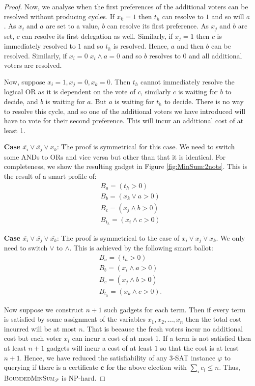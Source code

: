 \documentclass[11pt,a4paper, titlepage]{article}
\theoremstyle{definition}
\let\vec\mathbf
\begin{document}
\begin{proof}
    Now, we analyse when the first preferences of the additional voters can be resolved without producing cycles. 
    If $x_k = 1$ then $t_h$ can resolve to $1$ and so will $a$. 
    As $x_i$ and $a$ are set to a value, $b$ can resolve its first preference. 
    As $x_j$ and $b$ are set, $c$ can resolve its first delegation as well. 
    Similarly, if $x_j = 1$ then $c$ is immediately resolved to $1$ and so $t_h$ is resolved. 
    Hence, $a$ and then $b$ can be resolved. 
    Similarly, if $x_i = 0$ $x_i \land a = 0$ and so $b$ resolves to $0$ and all additional voters are resolved.
    
    Now, suppose $x_i = 1, x_j = 0, x_k = 0$. Then $t_h$ cannot immediately resolve the logical OR as it is dependent on the vote of $c$, similarly $c$ is waiting for $b$ to decide, and $b$ is waiting for $a$. 
    But $a$ is waiting for $t_h$ to decide. 
    There is no way to resolve this cycle, and so one of the additional voters we have introduced will have to vote for their second preference. 
    This will incur an additional cost of at least 1.

    \textbf{Case} $\overline{x_i} \lor \overline{x_j} \lor x_k$: 
    The proof is symmetrical for this case. We need to switch some ANDs to ORs and vice versa but other than that it is identical. 
    For completeness, we show the resulting gadget in Figure \ref{fig:MinSum:2nots}. 
    This is the result of a smart profile of:
    \begin{align*}
        &B_a = (t_h > 0) \\
        &B_b = (x_k \lor a > 0) \\
        &B_c = (x_j \land b > 0) \\
        &B_{t_h} = (x_i \land c > 0)
    \end{align*}


    \textbf{Case} $\overline{x_i} \lor \overline{x_j} \lor \overline{x_k}$:
    The proof is symmetrical to the case of $x_i \lor x_j \lor x_k$. We only need to switch $\lor$ to $\land$. This is achieved by the following smart ballot:
    \begin{align*}
        &B_a = (t_h > 0) \\
        &B_b = (x_i \land a > 0) \\
        &B_c = (x_j \land b > 0) \\
        &B_{t_h} = (x_k \land c > 0).
    \end{align*}
    
    Now suppose we construct $n + 1$ such gadgets for each term. Then if every term is satisfied by some assignment of the variables $x_1, x_2, \ldots, x_n$ then the total cost incurred will be at most $n$. That is because the fresh voters incur no additional cost but each voter $x_i$ can incur a cost of at most 1.
    If a term is not satisfied then at least $n+1$ gadgets will incur a cost of at least $1$ so that the cost is at least $n+1$. 
    Hence, we have reduced the satisfiability of any \textsc{3-SAT} instance $\varphi$ to querying if there is a certificate $\vec{c}$ for the above election with $\sum_{i} c_i \leq n$. Thus, \textsc{BoundedMinSum}$_\mathcal{F}$ is NP-hard.
\end{proof}
\end{document}
